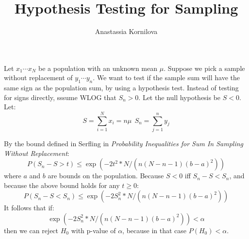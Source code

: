 \documentclass[12pt]{article}
\begin{document}
\title{Hypothesis Testing for Sampling}
\author{Anastassia Kornilova}
\date{}
\maketitle

Let $x_1 \cdots x_N$ be a population with an unknown mean $\mu$. Suppose we pick a sample without replacement of $y_1 \cdots y_n$. We want to test if the sample sum will have the same sign as the population sum, by using a hypothesis test. Instead of testing for signs directly, sssume WLOG that $S_n > 0$. Let the null hypothesis be $S < 0$. Let: \\
$$S = \sum_{i=1}^N x_i = n\mu \ \  S_n = \sum_{j=1}^n y_j$$

By the bound defined in Serfling in {\it Probability Inequalities for Sum In Sampling Without Replacement}:
$$ P( S_n - S  > t ) \leq   \exp(-2 t^2 * N/ (n (N-n-1)(b-a)^2)) $$
where $a$ and $b$ are bounds on the population. Because $S<0$ iff $S_n - S < S_n$, and because the above bound holds for any $t \geq 0$:
$$ P(S_n - S < S_n) \leq  \exp(-2 S_n^2 * N/ (n (N-n-1)(b-a)^2)) $$
It follows that if:
$$\exp(-2 S_n^2 * N/ (n (N-n-1)(b-a)^2)) < \alpha$$
then we can reject $H_0$ with p-value of $\alpha$, because in that case $P(H_0) < \alpha$.
\end{document}
